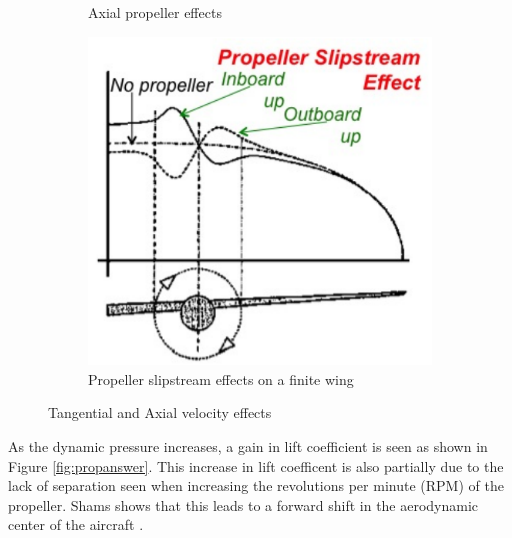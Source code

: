 \begin{figure}[H]
\begin{subfigure}[b]{0.28\textwidth}
         \caption{Axial propeller effects}
         \label{fig:2b}
     \end{subfigure}
     \hfill
     \begin{subfigure}[b]{0.28\textwidth}
          \centering
      \includegraphics[width=\linewidth]{03_LiteratureReview/Figs/slipstream.png}
      \caption{ Propeller slipstream effects on a finite wing \cite{Ferraro2014}}
      \label{fig:overallProp}
     \end{subfigure}
     \hfill
        \caption{Tangential and Axial velocity effects \cite{Ferraro2014}}
        \label{fig:prop}
\end{figure}



As the dynamic pressure increases, a gain in lift coefficient is seen as shown in Figure \ref{fig:propanswer}. This increase in lift coefficent is also partially due to the lack of separation seen when increasing the revolutions per minute (RPM) of the propeller. Shams shows that this leads to a forward shift in the aerodynamic center of the aircraft \cite{Shams2020} \cite{Shams2020b}.


